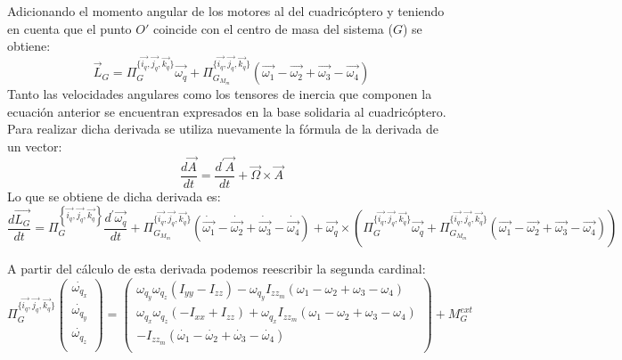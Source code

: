 \documentclass[main]{subfiles}
\begin{document}
Adicionando el momento angular de los motores al del cuadric\'optero y teniendo en cuenta que el punto $O\prime$ coincide con el centro de masa del sistema ($G$) se obtiene:
\begin{equation}
\vec{L}_{G}=\Pi_{G}^{\{\vec{i_q}, \vec{j_q}, \vec{k_q}\}}\vec{\omega_q}+\Pi_{G_{M_{m}}}^{\{\vec{i_q}, \vec{j_q}, \vec{k_q}\}}(\vec{\omega_1}-\vec{\omega_2}+\vec{\omega_3}-\vec{\omega_4})
\end{equation}
Tanto las velocidades angulares como los tensores de inercia que componen la ecuaci\'on anterior se encuentran expresados en la base solidaria al cuadric\'optero. Para realizar dicha derivada se utiliza nuevamente la f\'ormula de la derivada de un vector:
\begin{equation}
\frac{d\vec{A}}{dt} =\frac{d^\prime\vec{A}}{dt}+\vec{\Omega}\times\vec{A} 
\end{equation}
Lo que se obtiene de dicha derivada es:
{\footnotesize \begin{equation}
\frac{d\vec{L_G}}{dt}=\Pi_{G}^{\left\lbrace\vec{i_q}, \vec{j_q}, \vec{k_q}\right\rbrace}\frac{d^\prime\vec{{\omega}_q}}{dt}+\Pi_{G_{M_{m}}}^{\{\vec{i_q}, \vec{j_q}, \vec{k_q}\}}(\dot{\vec{\omega_1}}-\dot{\vec{\omega_2}}+\dot{\vec{\omega_3}}-\dot{\vec{\omega_4}})
+\vec{\omega_q}\times(\Pi_{G}^{\{\vec{i_q}, \vec{j_q}, \vec{k_q}\}}\vec{\omega_q}+\Pi_{G_{M_{m}}}^{\{\vec{i_q}, \vec{j_q}, \vec{k_q}\}}(\vec{\omega_1}-\vec{\omega_2}+\vec{\omega_3}-\vec{\omega_4}))
\end{equation}}

A partir del c\'alculo de esta derivada podemos reescribir la segunda cardinal:
\begin{equation}
 \Pi_{G}^{\{\vec{i_q}, \vec{j_q}, \vec{k_q}\}}\left(\begin{array}{c}
\dot{\omega_{q_x}}\\
\dot{\omega_{q_y}}\\
\dot{\omega_{q_z}}\\
\end{array}\right) = \left(\begin{array}{c}
\omega_{q_y}\omega_{q_z}(I_{yy}-I_{zz})-\omega_{q_y}I_{zz_m}(\omega_1-\omega_2+\omega_3-\omega_4)\\

\omega_{q_x}\omega_{q_z}(-I_{xx}+I_{zz})+\omega_{q_x}I_{zz_m}(\omega_1-\omega_2+\omega_3-\omega_4)\\

-I_{zz_m}(\dot{\omega_1}-\dot{\omega_2}+\dot{\omega_3}-\dot{\omega_4})\\

\end{array}\right) + M_G^{ext}
\label{eq:omegas}
\end{equation}
\end{document}
